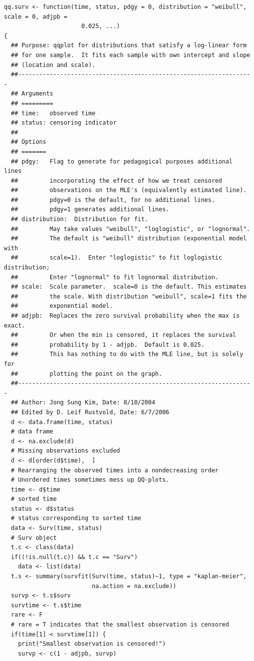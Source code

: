 \documentclass[
]{article}
\begin{document}
\begin{verbatim}
qq.surv <- function(time, status, pdgy = 0, distribution = "weibull", scale = 0, adjpb = 
                      0.025, ...)
{
  ## Purpose: qqplot for distributions that satisfy a log-linear form
  ## for one sample.  It fits each sample with own intercept and slope 
  ## (location and scale).
  ##-------------------------------------------------------------------
  ## Arguments
  ## =========
  ## time:   observed time
  ## status: censoring indicator
  ##
  ## Options
  ## =======
  ## pdgy:   Flag to generate for pedagogical purposes additional lines
  ##         incorporating the effect of how we treat censored
  ##         observations on the MLE's (equivalently estimated line).
  ##         pdgy=0 is the default, for no additional lines. 
  ##         pdgy=1 generates additional lines.
  ## distribution:  Distribution for fit.
  ##         May take values "weibull", "loglogistic", or "lognormal".
  ##         The default is "weibull" distribution (exponential model with
  ##         scale=1).  Enter "loglogistic" to fit loglogistic distribution;
  ##         Enter "lognormal" to fit lognormal distribution. 
  ## scale:  Scale parameter.  scale=0 is the default. This estimates 
  ##         the scale. With distribution "weibull", scale=1 fits the 
  ##         exponential model. 
  ## adjpb:  Replaces the zero survival probability when the max is exact.
  ##         Or when the min is censored, it replaces the survival 
  ##         probability by 1 - adjpb.  Default is 0.025. 
  ##         This has nothing to do with the MLE line, but is solely for 
  ##         plotting the point on the graph.
  ##-------------------------------------------------------------------
  ## Author: Jong Sung Kim, Date: 8/10/2004
  ## Edited by D. Leif Rustvold, Date: 6/7/2006
  d <- data.frame(time, status)
  # data frame 
  d <- na.exclude(d)
  # Missing observations excluded
  d <- d[order(d$time),  ]
  # Rearranging the observed times into a nondecreasing order
  # Unordered times sometimes mess up QQ-plots. 
  time <- d$time
  # sorted time
  status <- d$status
  # status corresponding to sorted time
  data <- Surv(time, status)
  # Surv object
  t.c <- class(data)
  if((!is.null(t.c)) && t.c == "Surv")
    data <- list(data)
  t.s <- summary(survfit(Surv(time, status)~1, type = "kaplan-meier",
                         na.action = na.exclude))
  survp <- t.s$surv
  survtime <- t.s$time
  rare <- F
  # rare = T indicates that the smallest observation is censored
  if(time[1] < survtime[1]) {
    print("Smallest observation is censored!")
    survp <- c(1 - adjpb, survp)

\end{verbatim}
\end{document}
